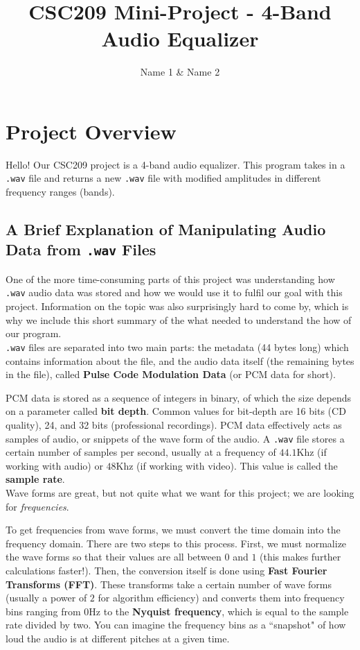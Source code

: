 \documentclass{article}
\title{CSC209 Mini-Project - 4-Band Audio Equalizer}
\author{Name 1 & Name 2}
\begin{document}
\maketitle

\section{Project Overview}\label{desc}

Hello! Our CSC209 project is a 4-band audio equalizer. This program takes in a \texttt{.wav} file and returns a new \texttt{.wav} file with modified amplitudes in different frequency ranges (bands).

\subsection{A Brief Explanation of Manipulating Audio Data from \texttt{.wav} Files}\label{wav}

One of the more time-consuming parts of this project was understanding how \texttt{.wav} audio data was stored and how we would use it to fulfil our goal with this project. Information on the topic was also surprisingly hard to come by, which is why we include this short summary of the what needed to understand the how of our program. \\

\texttt{.wav} files are separated into two main parts: the metadata (44 bytes long) which contains information about the file, and the audio data itself (the remaining bytes in the file), called \textbf{Pulse Code Modulation Data} (or PCM data for short).

PCM data is stored as a sequence of integers in binary, of which the size depends on a parameter called \textbf{bit depth}. Common values for bit-depth are 16 bits (CD quality), 24, and 32 bits (professional recordings). PCM data effectively acts as samples of audio, or snippets of the wave form of the audio. A \texttt{.wav} file stores a certain number of samples per second, usually at a frequency of $44.1$Khz (if working with audio) or $48$Khz (if working with video). This value is called the \textbf{sample rate}.\\

Wave forms are great, but not quite what we want for this project; we are looking for \textit{frequencies}.

To get frequencies from wave forms, we must convert the time domain into the frequency domain. There are two steps to this process. First, we must normalize the wave forms so that their values are all between $0$ and $1$ (this makes further calculations faster!). Then, the conversion itself is done using \textbf{Fast Fourier Transforms (FFT)}. These transforms take a certain number of wave forms (usually a power of $2$ for algorithm efficiency) and converts them into frequency bins ranging from $0$Hz to the \textbf{Nyquist frequency}, which is equal to the sample rate divided by two. You can imagine the frequency bins as a ``snapshot" of how loud the audio is at different pitches at a given time.\\
\end{document}
